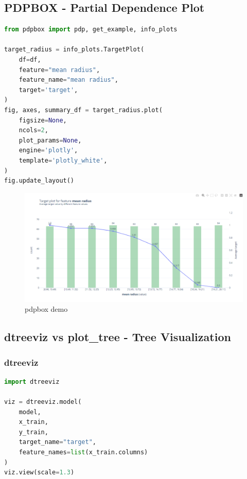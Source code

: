 \newpage

\subsection{PDPBOX - Partial Dependence Plot}
\begin{lstlisting}[language=Python]
from pdpbox import pdp, get_example, info_plots

target_radius = info_plots.TargetPlot(
    df=df,
    feature="mean radius",
    feature_name="mean radius",
    target='target',
)
fig, axes, summary_df = target_radius.plot(
    figsize=None,
    ncols=2,
    plot_params=None,
    engine='plotly',
    template='plotly_white',
)
fig.update_layout()
\end{lstlisting}

\begin{figure}[ht]
    \centering
    \includegraphics[width=1.0\textwidth]{images/pdpbox_demo.png}
    \caption{pdpbox demo}
    \label{fig:enter-label}
\end{figure}

\newpage

\subsection{dtreeviz  vs plot\_tree - Tree Visualization}
\subsubsection{dtreeviz}
\begin{lstlisting}[language=Python]
import dtreeviz

viz = dtreeviz.model(
    model,
    x_train,
    y_train,
    target_name="target",
    feature_names=list(x_train.columns)
)
viz.view(scale=1.3)
\end{lstlisting}

